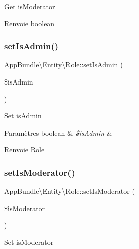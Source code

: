 Get is\+Moderator

\begin{DoxyReturn}{Renvoie}
boolean 
\end{DoxyReturn}
\mbox{\label{classAppBundle_1_1Entity_1_1Role_a45fa2f158f13af1b3ccc5673075b814e}} 
\subsubsection{\texorpdfstring{set\+Is\+Admin()}{setIsAdmin()}}
{\footnotesize\ttfamily App\+Bundle\textbackslash{}\+Entity\textbackslash{}\+Role\+::set\+Is\+Admin (\begin{DoxyParamCaption}\item[{}]{\$is\+Admin }\end{DoxyParamCaption})}

Set is\+Admin


\begin{DoxyParams}[1]{Paramètres}
boolean & {\em \$is\+Admin} & \\
\hline
\end{DoxyParams}
\begin{DoxyReturn}{Renvoie}
\hyperlink{classAppBundle_1_1Entity_1_1Role}{Role} 
\end{DoxyReturn}
\mbox{\label{classAppBundle_1_1Entity_1_1Role_a82ea08d642dbfd8b35c0053e44b43ad3}} 
\subsubsection{\texorpdfstring{set\+Is\+Moderator()}{setIsModerator()}}
{\footnotesize\ttfamily App\+Bundle\textbackslash{}\+Entity\textbackslash{}\+Role\+::set\+Is\+Moderator (\begin{DoxyParamCaption}\item[{}]{\$is\+Moderator }\end{DoxyParamCaption})}

Set is\+Moderator


